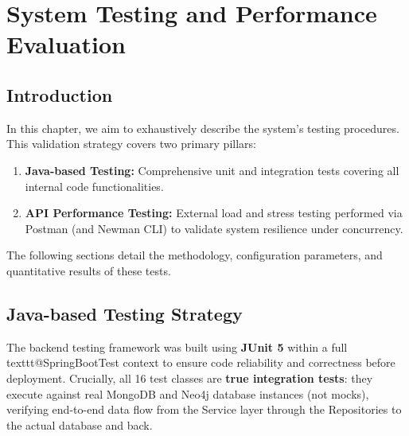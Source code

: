 \chapter{System Testing and Performance Evaluation}

\section{Introduction}
In this chapter, we aim to exhaustively describe the system's testing procedures. This validation strategy covers two primary pillars:
\begin{enumerate}
    \item \textbf{Java-based Testing:} Comprehensive unit and integration tests covering all internal code functionalities.
    \item \textbf{API Performance Testing:} External load and stress testing performed via Postman (and Newman CLI) to validate system resilience under concurrency.
\end{enumerate}

The following sections detail the methodology, configuration parameters, and quantitative results of these tests.


\section{Java-based Testing Strategy}

The backend testing framework was built using \textbf{JUnit 5} within a full \\texttt{@SpringBootTest} context to ensure code reliability and correctness before deployment. Crucially, all 16 test classes are \textbf{true integration tests}: they execute against real MongoDB and Neo4j database instances (not mocks), verifying end-to-end data flow from the Service layer through the Repositories to the actual database and back.

